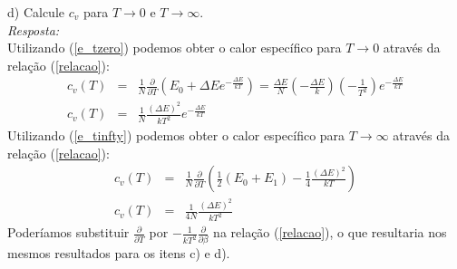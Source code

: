 \documentclass[11pt,leqno]{article}
\begin{document}
d) Calcule $c_{v}$ para $T \rightarrow 0$ e $T \rightarrow \infty$.\\
{\it Resposta:}\\
Utilizando (\ref{e_tzero}) podemos obter o calor específico para $T \rightarrow 0$ através da relação (\ref{relacao}):
\begin{eqnarray}
c_{v}(T)&=&\frac{1}{N} \frac{\partial }{\partial T} (E_{0}+\Delta E e^{-\frac{\Delta E}{kT}})=\frac{\Delta E}{N} \left(-\frac{\Delta E}{k}\right)\left(-\frac{1}{T^{2}}\right) e^{-\frac{\Delta E}{kT}} \nonumber \\
c_{v}(T)&=&\frac{1}{N} \frac{(\Delta E)^{2} }{k T^{2}}e^{-\frac{\Delta E}{kT}} \nonumber
\end{eqnarray}
Utilizando (\ref{e_tinfty}) podemos obter o calor específico para $T \rightarrow \infty$ através da relação (\ref{relacao}):
\begin{eqnarray}
c_{v}(T)&=&\frac{1}{N} \frac{\partial }{\partial T} \left( \frac{1}{2}(E_{0}+E_{1})-\frac{1}{4} \frac{(\Delta E)^{2}}{kT} \right) \nonumber \\
c_{v}(T)&=&\frac{1}{4 N} \frac{(\Delta E)^{2} }{k T^{2}} \nonumber
\end{eqnarray}
Poderíamos substituir $\frac{\partial }{\partial T}$ por $-\frac{1}{kT^{2}}\frac{\partial }{\partial \beta}$ na relação (\ref{relacao}), o que resultaria nos mesmos resultados para os itens c) e d).
\end{document}
